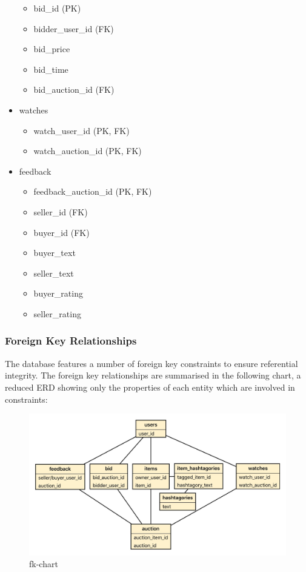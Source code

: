 \begin{itemize}
  \begin{itemize}
  \tightlist
  \item
    bid\_id (PK)
  \item
    bidder\_user\_id (FK)
  \item
    bid\_price
  \item
    bid\_time
  \item
    bid\_auction\_id (FK)
  \end{itemize}
\item
  watches

  \begin{itemize}
  \tightlist
  \item
    watch\_user\_id (PK, FK)
  \item
    watch\_auction\_id (PK, FK)
  \end{itemize}
\item
  feedback

  \begin{itemize}
  \tightlist
  \item
    feedback\_auction\_id (PK, FK)
  \item
    seller\_id (FK)
  \item
    buyer\_id (FK)
  \item
    buyer\_text
  \item
    seller\_text
  \item
    buyer\_rating
  \item
    seller\_rating
  \end{itemize}
\end{itemize}

\subsubsection{Foreign Key
Relationships}\label{foreign-key-relationships}

The database features a number of foreign key constraints to ensure
referential integrity. The foreign key relationships are summarised in
the following chart, a reduced ERD showing only the properties of each
entity which are involved in constraints:

\begin{figure}[htbp]
\centering
\includegraphics{Fk-diagram.jpeg}
\caption{fk-chart}
\end{figure}


